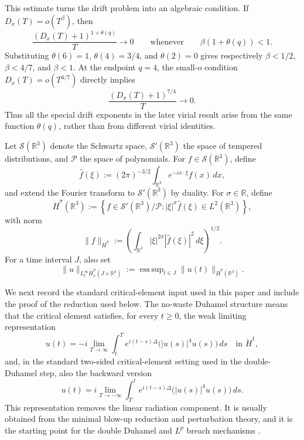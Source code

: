 \documentclass[10pt,a4paper]{amsart}
\numberwithin{equation}{section}
\newcommand{\R}{\mathbb R}
\begin{document}
This estimate turns the drift problem into an algebraic condition. If $D_x(T)=o(T^\beta)$, then
\[
  \frac{(D_x(T)+1)^{1+\theta(q)}}{T}\to0
  \qquad\text{whenever}\qquad
  \beta(1+\theta(q))<1.
\]
Substituting $\theta(6)=1$, $\theta(4)=3/4$, and $\theta(2)=0$ gives respectively $\beta<1/2$, $\beta<4/7$, and $\beta<1$. At the endpoint $q=4$, the small-$o$ condition $D_x(T)=o(T^{4/7})$ directly implies
\[
  \frac{(D_x(T)+1)^{7/4}}{T}\to0.
\]
Thus all the special drift exponents in the later virial result arise from the same function $\theta(q)$, rather than from different virial identities.

Let $\mathcal S(\R^3)$ denote the Schwartz space, $\mathcal S'(\R^3)$ the space of tempered distributions, and $\mathcal P$ the space of polynomials. For $f\in\mathcal S(\R^3)$, define
\begin{equation*}
  \widehat f(\xi):=(2\pi)^{-3/2}\int_{\R^3}e^{-ix\cdot\xi}f(x)\,dx,
\end{equation*}
and extend the Fourier transform to $\mathcal S'(\R^3)$ by duality. For $\sigma\in\R$, define
\begin{equation*}
  \dot H^\sigma(\R^3)
  :=\left\{f\in\mathcal S'(\R^3)/\mathcal P:
  |\xi|^\sigma\widehat f(\xi)\in L^2(\R^3)\right\},
\end{equation*}
with norm
\begin{equation*}
  \|f\|_{\dot H^\sigma}
  :=\left(\int_{\R^3}|\xi|^{2\sigma}|\widehat f(\xi)|^2\,d\xi\right)^{1/2}.
\end{equation*}
For a time interval $J$, also set
\begin{equation*}
  \|u\|_{L_t^\infty\dot H_x^\sigma(J\times\R^3)}
  :=\mathop{\mathrm{ess\,sup}}_{t\in J}\|u(t)\|_{\dot H^\sigma(\R^3)}.
\end{equation*}

We next record the standard critical-element input used in this paper and include the proof of the reduction used below. The no-waste Duhamel structure means that the critical element satisfies, for every $t\ge0$, the weak limiting representation
\begin{equation*}
  u(t)=-i\lim_{T\to\infty}\int_t^T e^{i(t-s)\Delta}\bigl(|u(s)|^4u(s)\bigr)\,ds
  \quad\text{in }\dot H^1,
\end{equation*}
and, in the standard two-sided critical-element setting used in the double-Duhamel step, also the backward version
\begin{equation*}
  u(t)=i\lim_{T\to-\infty}\int_T^t e^{i(t-s)\Delta}\bigl(|u(s)|^4u(s)\bigr)\,ds.
\end{equation*}
This representation removes the linear radiation component. It is usually obtained from the minimal blow-up reduction and perturbation theory, and it is the starting point for the double Duhamel and $L^p$ breach mechanisms \cite{KillipVisan2010,KillipVisan2013,Dodson2019}.
\end{document}
